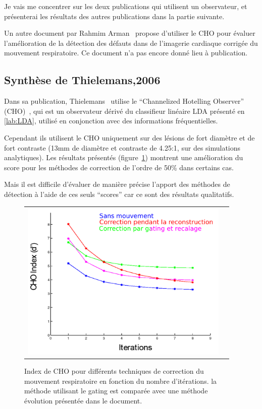 Je vais me concentrer sur les deux publications qui utilisent un observateur, et présenterai les résultats des autres publications dans la partie suivante.

Un autre document par Rahmim Arman~\cite{rahmim4d} propose d'utiliser le CHO pour évaluer l'amélioration de la détection des défauts dans de l'imagerie cardiaque corrigée du mouvement respiratoire. Ce document n'a pas encore donné lieu à publication.

\subsection{Synthèse de Thielemans,2006}

Dans sa publication, Thielemans~\cite{Thielemans2006Lesion} utilise le ``Channelized Hotelling Observer'' (CHO)~\cite{barrett1993model}, qui est un observateur dérivé du classifieur linéaire LDA présenté en \ref{lab:LDA}, utilisé en conjonction avec des informations fréquentielles. 

Cependant ils utilisent le CHO uniquement sur des lésions de fort diamètre et de fort contraste (13mm de diamètre et contraste de 4.25:1, sur des simulations analytiques). Les résultats présentés (figure~\ref{fig:apportCHO}) montrent une amélioration du score pour les méthodes de correction de l'ordre de 50\% dans certains cas. 

Mais il est difficile d'évaluer de manière précise l'apport des méthodes de détection à l'aide de ces seuls ``scores'' car ce sont des résultats qualitatifs. 

\begin{figure}[h!]
	\begin{center}
		\begin{tabular}{c c}
			\includegraphics[width=10cm]{images/apportCHO}
		\end{tabular}
	\end{center}
	\caption{Index de CHO pour différents techniques de correction du mouvement respiratoire en fonction du nombre d'itérations. la méthode utilisant le gating est comparée avec une méthode évolution présentée dans le document.} 
	\label{fig:apportCHO}
\end{figure}


